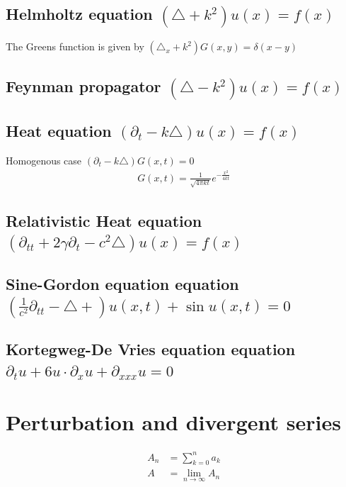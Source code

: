 \documentclass[10pt,a4paper]{book}
\theoremstyle{definition}
\begin{document}
\newpage
\subsection{Helmholtz equation \texorpdfstring{$(\triangle +k^2)u(x)= f(x)$}{TEXT}}
The Greens function is given by $(\triangle_x +k^2)G(x,y)=\delta(x-y)$

\subsection{Feynman propagator \texorpdfstring{$\left(\triangle-k^2\right) u(x)= f(x)$}{TEXT}}

\subsection{Heat equation \texorpdfstring{$\left(\partial_{t}-k\triangle\right) u(x)= f(x)$}{TEXT}}

Homogenous case $\left(\partial_{t}-k\triangle\right) G(x,t)=0$
\begin{align}
G(x,t)=\frac{1}{\sqrt{4\pi kt}}e^{-\frac{x^2}{4kt}}
\end{align}



\subsection{Relativistic Heat equation \texorpdfstring{$\left(\partial_{tt}+2\gamma\partial_t-c^2\triangle\right) u(x)= f(x)$}{TEXT}}

\subsection{Sine-Gordon equation equation \texorpdfstring{$\left(\frac{1}{c^2}\partial_{tt}-\triangle+\right) u(x,t)+\sin u(x,t)=0$}{TEXT}}

\subsection{Kortegweg-De Vries equation equation \texorpdfstring{$\partial_tu+6u\cdot\partial_x u+\partial_{xxx}u= 0$}{TEXT}}

\newpage
\section{Perturbation and divergent series}
\begin{align}
A_n&=\sum_{k=0}^{n}a_k\\
A&=\lim_{n\rightarrow\infty}A_n
\end{align}
\end{document}
